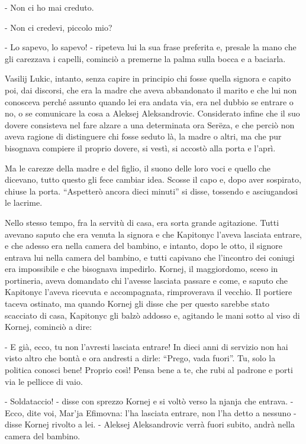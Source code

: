 - Non ci ho mai creduto. 

- Non ci credevi, piccolo mio? 

- Lo sapevo, lo sapevo! - ripeteva lui la sua frase preferita e, presale la mano che gli carezzava i capelli, cominciò a premerne la palma sulla bocca e a baciarla. 

Vasilij Lukic, intanto, senza capire in principio chi fosse quella signora e capito poi, dai discorsi, che era la madre che aveva abbandonato il marito e che lui non conosceva perché assunto quando lei era andata via, era nel dubbio se entrare o no, o se comunicare la cosa a Aleksej Aleksandrovic. Considerato infine che il suo dovere consisteva nel fare alzare a una determinata ora Serëza, e che perciò non aveva ragione di distinguere chi fosse seduto là, la madre o altri, ma che pur bisognava compiere il proprio dovere, si vestì, si accostò alla porta e l'aprì. 

Ma le carezze della madre e del figlio, il suono delle loro voci e quello che dicevano, tutto questo gli fece cambiar idea. Scosse il capo e, dopo aver sospirato, chiuse la porta. ``Aspetterò ancora dieci minuti'' si disse, tossendo e asciugandosi le lacrime. 

Nello stesso tempo, fra la servitù di casa, era sorta grande agitazione. Tutti avevano saputo che era venuta la signora e che Kapitonyc l'aveva lasciata entrare, e che adesso era nella camera del bambino, e intanto, dopo le otto, il signore entrava lui nella camera del bambino, e tutti capivano che l'incontro dei coniugi era impossibile e che bisognava impedirlo. Kornej, il maggiordomo, sceso in portineria, aveva domandato chi l'avesse lasciata passare e come, e saputo che Kapitonyc l'aveva ricevuta e accompagnata, rimproverava il vecchio. Il portiere taceva ostinato, ma quando Kornej gli disse che per questo sarebbe stato scacciato di casa, Kapitonyc gli balzò addosso e, agitando le mani sotto al viso di Kornej, cominciò a dire: 

- E già, ecco, tu non l'avresti lasciata entrare! In dieci anni di servizio non hai visto altro che bontà e ora andresti a dirle: ``Prego, vada fuori''. Tu, solo la politica conosci bene! Proprio così! Pensa bene a te, che rubi al padrone e porti via le pellicce di vaio. 

- Soldataccio! - disse con sprezzo Kornej e si voltò verso la njanja che entrava. - Ecco, dite voi, Mar'ja Efimovna: l'ha lasciata entrare, non l'ha detto a nessuno - disse Kornej rivolto a lei. - Aleksej Aleksandrovic verrà fuori subito, andrà nella camera del bambino. 

